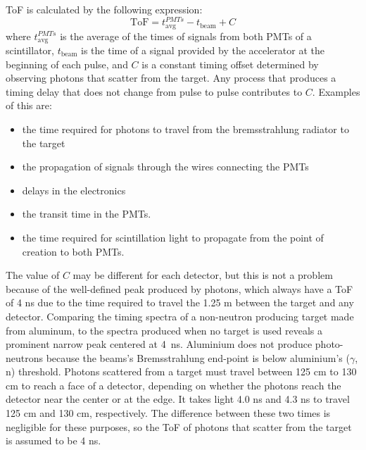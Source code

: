 ToF is calculated by the following expression:
\begin{displaymath}
\text{ToF} = t^{PMTs}_{\text{avg}} - t_{\text{beam}} + C
\end{displaymath}
where $t^{PMTs}_{\text{avg}}$ is the average of the times of signals from both PMTs of a scintillator, $t_{\text{beam}}$ is the time of a signal provided by the accelerator at the beginning of each pulse, and $C$ is a constant timing offset determined by observing photons that scatter from the target.
Any process that produces a timing delay that does not change from pulse to pulse contributes to $C$.
Examples of this are:\begin{itemize}
\item the time required for photons to travel from the bremsstrahlung radiator to the target
\item the propagation of signals through the wires connecting the PMTs
\item delays in the electronics
\item the transit time in the PMTs.
\item the time required for scintillation light to propagate from the point of creation to both PMTs.
\end{itemize}
The value of $C$ may be different for each detector, but this is not a problem because of the well-defined peak produced by photons, which always have a ToF of 4 ns due to the time required to travel the 1.25 m between the target and any detector.
Comparing the timing spectra of a non-neutron producing target made from aluminum, to the spectra produced when no target is used reveals a prominent narrow peak centered at 4~ns.
Aluminium does not produce photo-neutrons because the beams's Bremsstrahlung end-point is below aluminium's ($\gamma$, n) threshold.
Photons scattered from a target must travel between 125 cm to 130 cm to reach a face of a detector, depending on whether the photons reach the detector near the center or at the edge.
It takes light 4.0 ns and 4.3 ns to travel 125 cm and 130 cm, respectively.
The difference between these two times is negligible for these purposes, so the ToF of photons that scatter from the target is assumed to be 4 ns.


